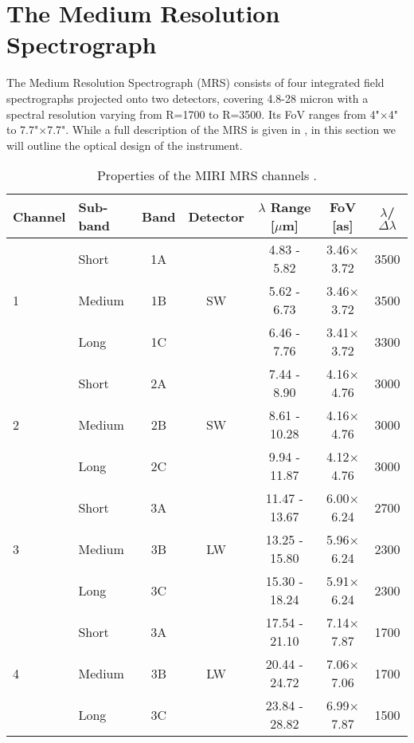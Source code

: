\section{The Medium Resolution Spectrograph}\label{sec:mrs}
The Medium Resolution Spectrograph (MRS) consists of four integrated field spectrographs projected onto two detectors, covering 4.8-28 micron with a spectral resolution varying from R=1700 to R=3500.
Its FoV ranges from 4"$\times$4" to 7.7"$\times$7.7".
While a full description of the MRS is given in \parencite{MIRI6}, in this section we will outline the optical design of the instrument.
\begin{table}[t]
	\begin{small}
	\centering
	\begin{tabular}{l|lc|cccc}
		\toprule
		\textbf{Channel} & \textbf{Sub-band} & \textbf{Band} & \textbf{Detector} & $\lambda$ \textbf{Range [$\mu$m]} & \textbf{FoV [as]} & $\lambda$/$\Delta\lambda$\\
		\midrule
		\multirow{3}{*}{1}  &Short & 1A & \multirow{3}{*}{SW}   & 4.83 - 5.82 & 3.46$\times$3.72 & 3500 \\
							&Medium & 1B &						& 5.62 - 6.73 & 3.46$\times$3.72 & 3500 \\
							& Long & 1C&						& 6.46 - 7.76 & 3.41$\times$3.72 & 3300 \\
		\midrule
		\multirow{3}{*}{2}  &Short & 2A & \multirow{3}{*}{SW}   & 7.44 - 8.90 & 4.16$\times$4.76 & 3000 \\
							&Medium & 2B &						& 8.61 - 10.28 & 4.16$\times$4.76 & 3000 \\
							& Long & 2C&						& 9.94 - 11.87 & 4.12$\times$4.76 & 3000 \\
		\midrule
		\multirow{3}{*}{3}  &Short & 3A & \multirow{3}{*}{LW}   & 11.47 - 13.67 & 6.00$\times$6.24 & 2700 \\
							&Medium & 3B &						& 13.25 - 15.80 & 5.96$\times$6.24 & 2300 \\
							& Long & 3C&						& 15.30 - 18.24 & 5.91$\times$6.24 & 2300 \\		
		\midrule
		\multirow{3}{*}{4}  &Short & 3A & \multirow{3}{*}{LW}   & 17.54 - 21.10 & 7.14$\times$7.87 & 1700 \\
							&Medium & 3B &						& 20.44 - 24.72 & 7.06$\times$7.06 & 1700 \\
							& Long & 3C&						& 23.84 - 28.82 & 6.99$\times$7.87 & 1500 \\			
		\bottomrule
	\end{tabular}
	\end{small}
	\caption{Properties of the MIRI MRS channels \parencite{MIRI6}.}
	\label{tab:mrs}
\end{table}

